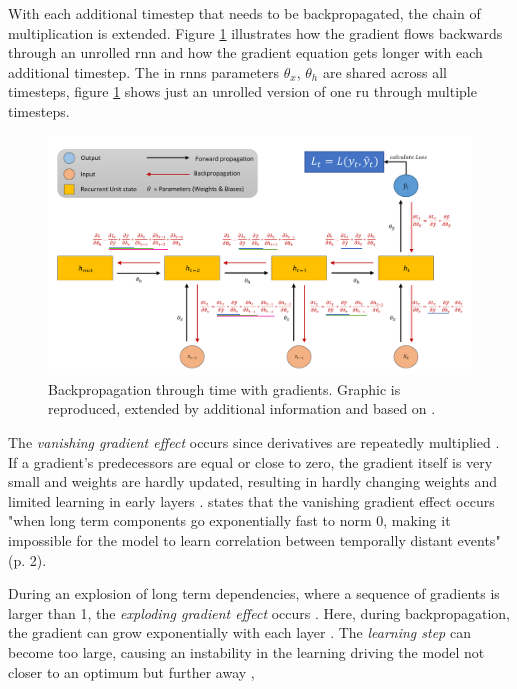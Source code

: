 \documentclass[11pt,
  paper=a4, 
  bibliography=totocnumbered,
	captions=tableheading,
	BCOR=10mm
]{scrreprt}
\theoremstyle{definition}
\def \figwidth {0.9\linewidth}
\begin{document}
With each additional timestep that needs to be backpropagated, the chain of multiplication is extended.
Figure \ref{fig:rnn-bptt-with-gradients} illustrates how the gradient flows backwards through an unrolled \gls{rnn} and how the gradient equation gets longer with each additional timestep.
The in \glspl{rnn} parameters $\theta_x$, $\theta_h$ are shared across all timesteps, figure \ref{fig:rnn-bptt-with-gradients} shows just an unrolled version of one \gls{ru} through multiple timesteps.

\begin{figure}[H]
	\centering
	\includegraphics[width=\figwidth]{rnn-bptt-with-gradients}
	\caption[Backpropagation through time]{
		Backpropagation through time with gradients. Graphic is reproduced, extended by additional information and based on \textcite{Britz2015}.
		\label{fig:rnn-bptt-with-gradients}}
\end{figure}

The \textit{vanishing gradient effect} occurs since derivatives are repeatedly multiplied \cite{Skansi2018}. 
If a gradient's predecessors are equal or close to zero, the gradient itself is very small and weights are hardly updated, resulting in hardly changing weights and limited learning in early layers \cite{Britz2015, Hochreiter1991, Lillicrap2019}.
\textcite{Pascanu2013} states that the vanishing gradient effect occurs 
"when long term components go exponentially fast to norm 0, 
making it impossible for the model to learn correlation between temporally distant events" (p. 2).

During an explosion of long term dependencies, where a sequence of gradients is larger than 1, the \textit{exploding gradient effect} occurs \cite{Pascanu2013}.
Here, during backpropagation, the gradient can grow exponentially with each layer \cite{Philipp2017, Hochreiter1997, Lillicrap2019}.
The \textit{learning step} can become too large, causing an instability in the learning \cite{Lillicrap2019} driving the model not closer to an optimum but further away \cite{Skansi2018},
\end{document}
